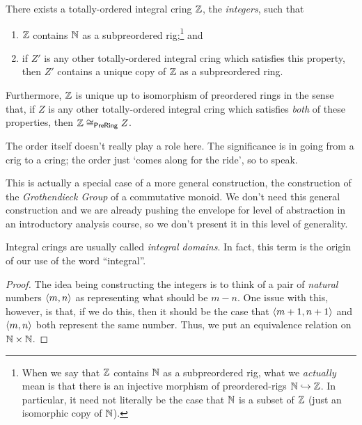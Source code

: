 \begin{thm}[Integers]\label{Integers}
\begin{savenotes}
There exists a totally-ordered integral cring $\Z$\index[notation]{$\Z$}, the \emph{integers}, such that
\begin{enumerate}
\item \label{enm1.2.1.1}$\Z$ contains $\mathbb{N}$ as a subpreordered rig;\footnote{When we say that $\Z$ contains $\mathbb{N}$ as a subpreordered rig, what we \emph{actually} mean is that there is an injective morphism of preordered-rigs $\mathbb{N} \hookrightarrow \mathbb{Z}$.  In particular, it need not literally be the case that $\mathbb{N}$ is a subset of $\Z$ (just an isomorphic copy of $\mathbb{N}$).} and
\item \label{enm1.2.1.2}if $Z'$ is any other totally-ordered integral cring which satisfies this property, then $Z'$ contains a unique copy of $\Z$ as a subpreordered ring.
\end{enumerate}
Furthermore, $\Z$ is unique up to isomorphism of preordered rings in the sense that, if $Z$ is any other totally-ordered integral cring which satisfies \emph{both} of these properties, then $\mathbb{Z} \cong _{\mathsf{Pre} \mathsf{Ring}}Z$.
\begin{rmk}
The order itself doesn't really play a role here.  The significance is in going from a crig to a cring; the order just `comes along for the ride', so to speak.
\end{rmk}
\begin{rmk}
This is actually a special case of a more general construction, the construction of the \emph{Grothendieck Group} of a commutative monoid.  We don't need this general construction and we are already pushing the envelope for level of abstraction in an introductory analysis course, so we don't present it in this level of generality.
\end{rmk}
\begin{rmk}
Integral crings are usually called \emph{integral domains}.  In fact, this term is the origin of our use of the word ``integral''.
\end{rmk}
\begin{proof}
The idea being constructing the integers is to think of a pair of \emph{natural} numbers $\langle m,n\rangle$ as representing what should be $m-n$.  One issue with this, however, is that, if we do this, then it should be the case that $\langle m+1,n+1\rangle$ and $\langle m,n\rangle$ both represent the same number.  Thus, we put an equivalence relation on $\mathbb{N} \times \mathbb{N}$.


\end{proof}
\end{savenotes}
\end{thm}
